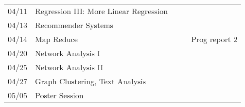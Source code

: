 \documentclass[11pt]{article}
\begin{document}
\begin{centering}
\begin{tabular}{||l|p{3in}|l|l|l||}
04/11 & Regression III: More Linear Regression & & &\\ 
04/13 & Recommender Systems & & & \\

04/14 & Map Reduce &  & &Prog report 2\\ 
 \hline

04/20 & Network Analysis I &  & & \\ 
04/25 & Network Analysis II && &\\
\hline 

04/27 & Graph Clustering, Text Analysis  & & & \\ 
05/05 & Poster Session &  &  &\\ 
\hline 

\hline\hline


\end{tabular}\\
\end{centering}
\end{document}
